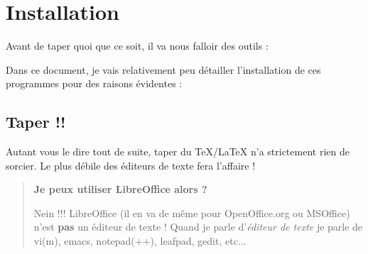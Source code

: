 \section{Installation} %
\label{sec:Installation}

Avant de taper quoi que ce soit, il va nous falloir des outils :

Dans ce document, je vais relativement peu détailler l'installation de ces programmes pour des raisons évidentes :

\subsection{Taper !!} %
\label{sub:Taper !!}

Autant vous le dire tout de suite, taper du \TeX/\LaTeX{} n'a strictement rien de sorcier. Le plus débile des éditeurs de texte fera l'affaire !

\begin{quotation}
    {\bfseries Je peux utiliser LibreOffice alors ?}

    Nein !!! LibreOffice (il en va de même pour OpenOffice.org ou MSOffice) n'est {\bfseries pas} un éditeur de texte !
    Quand je parle d'{\itshape éditeur de texte} je parle de vi(m), emacs, notepad(++), leafpad, gedit, etc...
\end{quotation}

